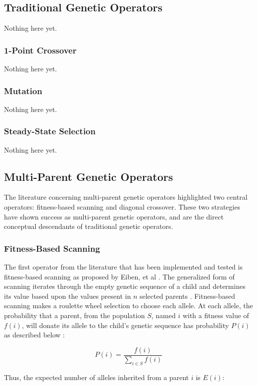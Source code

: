 \subsection*{Traditional Genetic Operators}
Nothing here yet.

\subsubsection*{1-Point Crossover}
Nothing here yet.

\subsubsection*{Mutation}
Nothing here yet.

\subsubsection*{Steady-State Selection}
Nothing here yet.

\subsection*{Multi-Parent Genetic Operators}
The literature concerning multi-parent genetic operators highlighted two central operators: fitness-based scanning and diagonal crossover. These two strategies have shown success as multi-parent genetic operators, and are the direct conceptual descendants of traditional genetic operators.

\subsubsection*{Fitness-Based Scanning}
The first operator from the literature that has been implemented and tested is fitness-based scanning as proposed by Eiben, et al \cite{Eiben94}. The generalized form of scanning iterates through the empty genetic sequence of a child and determines its value based upon the values present in $n$ selected parents \cite{Eiben91}. Fitness-based scanning makes a roulette wheel selection to choose each allele. At each allele, the probability that a parent, from the population $S$, named $i$ with a fitness value of $f(i)$, will donate its allele to the child's genetic sequence has probability $P(i)$ as described below \cite{Eiben94}: 

\[ P(i) = \frac{f(i)}{\sum\limits_{i \in S} f(i)} \]

\noindent Thus, the expected number of alleles inherited from a parent $i$ is $E(i)$\cite{Eiben94}:

